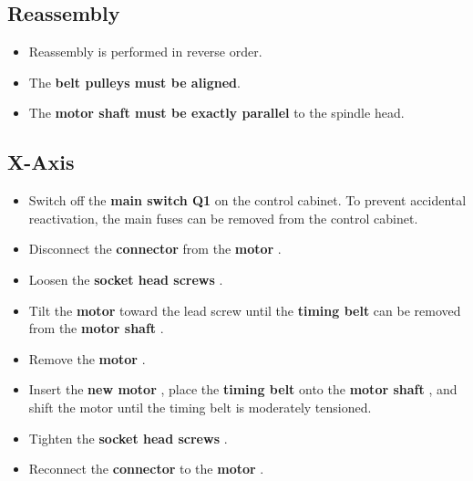 \subsection*{Reassembly}

\begin{itemize}
    \setlength{\itemsep}{0pt} \setlength{\parskip}{0pt}
    \item Reassembly is performed in reverse order.
    \item The \textbf{belt pulleys must be aligned}. \footnotemark[1]
    \item The \textbf{motor shaft must be exactly parallel} to the spindle head. \footnotemark[1]
\end{itemize}



\setcounter{section}{8}

\subsection*{X-Axis}

\begin{itemize}
    \setlength{\itemsep}{0pt} \setlength{\parskip}{0pt}
    \item Switch off the \textbf{main switch Q1} on the control cabinet.  
          To prevent accidental reactivation, the main fuses can be removed from the control cabinet.
    \item Disconnect the \textbf{connector} from the \textbf{motor }.
    \item Loosen the \textbf{socket head screws }.
    \item Tilt the \textbf{motor } toward the lead screw until the \textbf{timing belt } can be removed from the \textbf{motor shaft }.
    \item Remove the \textbf{motor }.
    \item Insert the \textbf{new motor }, place the \textbf{timing belt } onto the \textbf{motor shaft },  
          and shift the motor until the timing belt is moderately tensioned.
    \item Tighten the \textbf{socket head screws }.
    \item Reconnect the \textbf{connector} to the \textbf{motor }.
\end{itemize}


